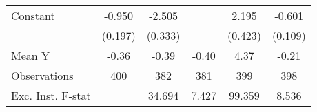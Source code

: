 {\begin{tabular}{l*{5}{c}}
\addlinespace
Constant            &      -0.950\sym{***}&      -2.505\sym{***}&                     &       2.195\sym{***}&      -0.601\sym{***}\\
                    &     (0.197)         &     (0.333)         &                     &     (0.423)         &     (0.109)         \\
\midrule
Mean Y              &       -0.36         &       -0.39         &       -0.40         &        4.37         &       -0.21         \\
Observations        &         400         &         382         &         381         &         399         &         398         \\
Exc. Inst. F-stat   &                     &      34.694         &       7.427         &      99.359         &       8.536         \\
\bottomrule
\end{tabular}
}
